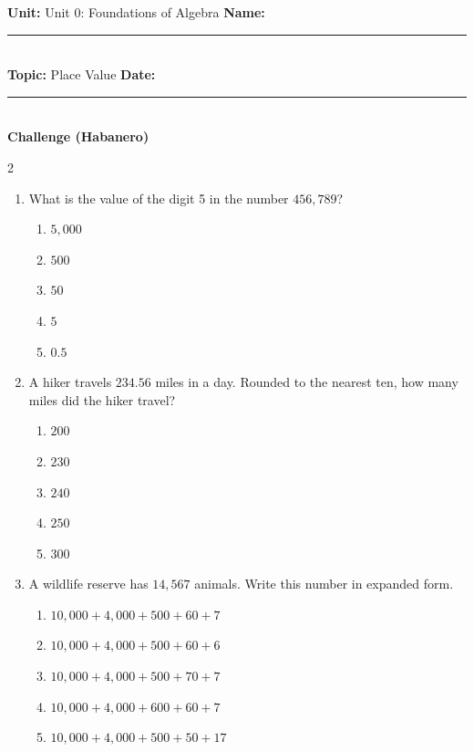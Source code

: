 \documentclass[10pt]{article}
\begin{document}
\enlargethispage{2.5cm}

\begin{tcolorbox}[colback=mainblue!5, colframe=mainblue, sharp corners, boxrule=0.5pt]
    \small \textbf{Unit:} Unit 0: Foundations of Algebra \hfill \textbf{Name:} \rule{3cm}{0.4pt} \\
    \small \textbf{Topic:} Place Value \hfill \textbf{Date:} \rule{2cm}{0.4pt} \\
    \centering \textbf{\large Challenge (Habanero)}
\end{tcolorbox}

\vspace{0.2cm}

\begin{multicols}{2}
\begin{enumerate}[label=\textbf{Q\arabic*.}, leftmargin=*, itemsep=6pt, parsep=0pt]

  \item \small What is the value of the digit 5 in the number $456,789$?
  \begin{enumerate}[label=(\Alph*), leftmargin=0.6cm, nosep, itemsep=2pt]
    \item $5,000$
    \item $500$
    \item $50$
    \item $5$
    \item $0.5$
  \end{enumerate}

  \item \small A hiker travels $234.56$ miles in a day. Rounded to the nearest ten, how many miles did the hiker travel?
  \begin{enumerate}[label=(\Alph*), leftmargin=0.6cm, nosep, itemsep=2pt]
    \item $200$
    \item $230$
    \item $240$
    \item $250$
    \item $300$
  \end{enumerate}

  \item \small A wildlife reserve has $14,567$ animals. Write this number in expanded form.
  \begin{enumerate}[label=(\Alph*), leftmargin=0.6cm, nosep, itemsep=2pt]
    \item $10,000 + 4,000 + 500 + 60 + 7$
    \item $10,000 + 4,000 + 500 + 60 + 6$
    \item $10,000 + 4,000 + 500 + 70 + 7$
    \item $10,000 + 4,000 + 600 + 60 + 7$
    \item $10,000 + 4,000 + 500 + 50 + 17$
  \end{enumerate}


\end{enumerate}
\end{multicols}
\end{document}
